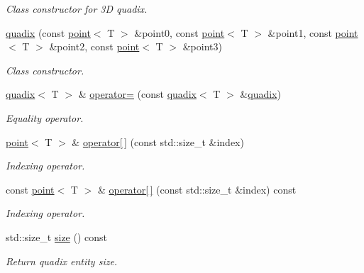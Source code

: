 \begin{DoxyCompactItemize}
\begin{DoxyCompactList}\small\item\em Class constructor for 3D quadix. \end{DoxyCompactList}\item 
\hyperlink{classddd_1_1quadix_a6820f2c802c25768a0e1d70cbac5fb2a}{quadix} (const \hyperlink{classddd_1_1point}{point}$<$ T $>$ \&point0, const \hyperlink{classddd_1_1point}{point}$<$ T $>$ \&point1, const \hyperlink{classddd_1_1point}{point}$<$ T $>$ \&point2, const \hyperlink{classddd_1_1point}{point}$<$ T $>$ \&point3)
\begin{DoxyCompactList}\small\item\em Class constructor. \end{DoxyCompactList}\item 
\hyperlink{classddd_1_1quadix}{quadix}$<$ T $>$ \& \hyperlink{classddd_1_1quadix_a6a739b72a0bf5d07758c17cf5c2a08a7}{operator=} (const \hyperlink{classddd_1_1quadix}{quadix}$<$ T $>$ \&\hyperlink{classddd_1_1quadix}{quadix})
\begin{DoxyCompactList}\small\item\em Equality operator. \end{DoxyCompactList}\item 
\hyperlink{classddd_1_1point}{point}$<$ T $>$ \& \hyperlink{classddd_1_1quadix_a46ccfe1c37d09fd9fe0a7edb24a8d18f}{operator\mbox{[}$\,$\mbox{]}} (const std\+::size\+\_\+t \&index)
\begin{DoxyCompactList}\small\item\em Indexing operator. \end{DoxyCompactList}\item 
const \hyperlink{classddd_1_1point}{point}$<$ T $>$ \& \hyperlink{classddd_1_1quadix_a667e457ba6c63687dad1b9822655c53a}{operator\mbox{[}$\,$\mbox{]}} (const std\+::size\+\_\+t \&index) const
\begin{DoxyCompactList}\small\item\em Indexing operator. \end{DoxyCompactList}\item 
\mbox{\label{classddd_1_1quadix_afbf1b46c5467040cc45158bddcb7f21c}} 
std\+::size\+\_\+t \hyperlink{classddd_1_1quadix_afbf1b46c5467040cc45158bddcb7f21c}{size} () const
\begin{DoxyCompactList}\small\item\em Return quadix entity size. \end{DoxyCompactList}\end{DoxyCompactItemize}


